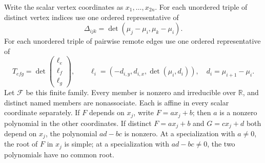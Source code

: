 \begin{lemma}
\label{lem:transport-polynomials}
Write the scalar vertex coordinates as $x_1,\ldots,x_{2n}$.
For each unordered triple of distinct vertex indices use one ordered
representative of
\begin{equation}\label{transport:delta}
 \Delta_{ijk}=\det(\mu_j-\mu_i,\mu_k-\mu_i).
\end{equation}
For each unordered triple of pairwise remote edges use one ordered
representative of
\begin{equation}\label{transport:T}
 T_{efg}=\det\begin{pmatrix}\ell_e\\\ell_f\\\ell_g\end{pmatrix},
 \qquad \ell_i=(-d_{i,y},d_{i,x},\det(\mu_i,d_i)),
 \quad d_i=\mu_{i+1}-\mu_i.
\end{equation}
Let $\mathcal F$ be this finite family. Every member is nonzero and
irreducible over $\mathbb R$, and distinct named members are nonassociate.
Each is affine in every scalar coordinate separately. If $F$ depends on
$x_j$, write $F=a x_j+b$; then $a$ is a nonzero polynomial in the other
coordinates. If distinct $F=a x_j+b$ and $G=c x_j+d$ both depend on $x_j$,
the polynomial $ad-bc$ is nonzero. At a specialization with $a\ne0$,
the root of $F$ in $x_j$ is simple; at a specialization with $ad-bc\ne0$,
the two polynomials have no common root.
\end{lemma}
